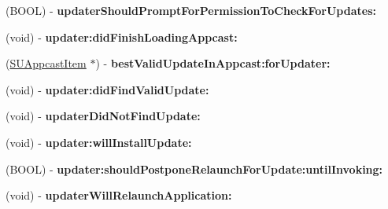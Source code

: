 \begin{DoxyCompactItemize}
(B\+O\+OL) -\/ {\bfseries updater\+Should\+Prompt\+For\+Permission\+To\+Check\+For\+Updates\+:}
\item 
\mbox{\label{category_n_s_object_07_s_u_updater_delegate_informal_protocol_08_aeddf46576356b1ad9ab409dc0eae5096}} 
(void) -\/ {\bfseries updater\+:did\+Finish\+Loading\+Appcast\+:}
\item 
\mbox{\label{category_n_s_object_07_s_u_updater_delegate_informal_protocol_08_a513cb4e0b03847e5e24020d269c090ba}} 
(\mbox{\hyperlink{interface_s_u_appcast_item}{S\+U\+Appcast\+Item}} $\ast$) -\/ {\bfseries best\+Valid\+Update\+In\+Appcast\+:for\+Updater\+:}
\item 
\mbox{\label{category_n_s_object_07_s_u_updater_delegate_informal_protocol_08_a05181fb779b775258e98c942c88ae8c5}} 
(void) -\/ {\bfseries updater\+:did\+Find\+Valid\+Update\+:}
\item 
\mbox{\label{category_n_s_object_07_s_u_updater_delegate_informal_protocol_08_a1ef903fd2efd0be0cfa1a7f0d994dd74}} 
(void) -\/ {\bfseries updater\+Did\+Not\+Find\+Update\+:}
\item 
\mbox{\label{category_n_s_object_07_s_u_updater_delegate_informal_protocol_08_a327b27fb3e47b4399c8961fade4d7484}} 
(void) -\/ {\bfseries updater\+:will\+Install\+Update\+:}
\item 
\mbox{\label{category_n_s_object_07_s_u_updater_delegate_informal_protocol_08_ab378ea6792234721301c33cc9f1956b3}} 
(B\+O\+OL) -\/ {\bfseries updater\+:should\+Postpone\+Relaunch\+For\+Update\+:until\+Invoking\+:}
\item 
\mbox{\label{category_n_s_object_07_s_u_updater_delegate_informal_protocol_08_adf1d28b303787beb6c24bd65899f91a5}} 
(void) -\/ {\bfseries updater\+Will\+Relaunch\+Application\+:}
\item 

\end{DoxyCompactItemize}
